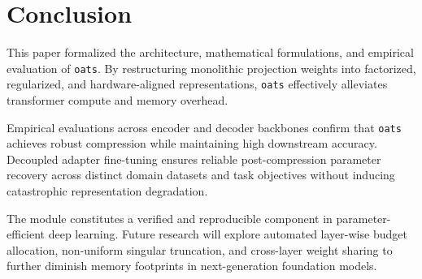 \section{Conclusion}
This paper formalized the architecture, mathematical formulations, and empirical evaluation of \texttt{oats}. By restructuring monolithic projection weights into factorized, regularized, and hardware-aligned representations, \texttt{oats} effectively alleviates transformer compute and memory overhead.

Empirical evaluations across encoder and decoder backbones confirm that \texttt{oats} achieves robust compression while maintaining high downstream accuracy. Decoupled adapter fine-tuning ensures reliable post-compression parameter recovery across distinct domain datasets and task objectives without inducing catastrophic representation degradation.

The module constitutes a verified and reproducible component in parameter-efficient deep learning. Future research will explore automated layer-wise budget allocation, non-uniform singular truncation, and cross-layer weight sharing to further diminish memory footprints in next-generation foundation models.
